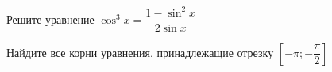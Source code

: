 \begin{ex}
	\begin{condition}
		\begin{enumcols}[label=\asbuk*)]
			\item Решите уравнение \( \cos^3 x = \dfrac{1 - \sin^2 x}{2\sin x} \)
			\item Найдите все корни уравнения, принадлежащие отрезку \(  \left[-\pi;-\dfrac{\pi}{2}\right] \)
		\end{enumcols}
	\end{condition}
\end{ex}